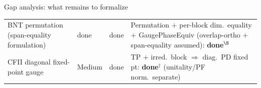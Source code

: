 \documentclass[aspectratio=169,10pt]{beamer}
\begin{document}
\begin{frame}{Gap analysis: what remains to formalize}
{\begin{tabular}{p{} p{} p{} p{}}
            BNT permutation (span-equality formulation)
                         & \textcolor{leangreen}{done}
                         & \textcolor{leangreen}{done}
                         & Permutation $+$ per-block dim.\ equality $+$ GaugePhaseEquiv
                           (overlap-ortho $+$ span-equality assumed):
                           \textcolor{leangreen}{\textbf{done}}$^{\S}$ \\
            \rowcolor{cardbg}
            CFII diagonal fixed-point gauge
                         & Medium              & \textcolor{leangreen}{done}
                         & TP + irred.\ block $\Rightarrow$ diag.\ PD fixed pt:
                           \textcolor{leangreen}{\textbf{done}}$^{\dagger}$
                           (unitality/PF norm.\ separate)                          \\
            \bottomrule
        \end{tabular}
    }


\end{frame}
\end{document}
